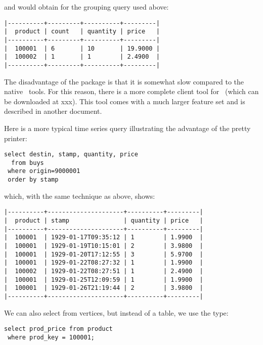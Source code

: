 and would obtain for the grouping query used above:

\begin{minipage}{\textwidth}
\begin{verbatim}
|----------+---------+----------+---------|
|  product | count   | quantity | price   |
|----------+---------+----------+---------|
|  100001  | 6       | 10       | 19.9000 |
|  100002  | 1       | 1        | 2.4900  |
|----------+---------+----------+---------|
\end{verbatim}
\end{minipage}

The disadvantage of the  package is that
it is somewhat slow compared to the native \nowdb\ tools.
For this reason, there is a more complete client tool
for \nowdb\ (which can be downloaded at xxx).
This tool comes with a much larger feature set
and is described in another document.

Here is a more typical time series query illustrating
the advantage of the pretty printer:

\begin{sqlcode}
\begin{lstlisting}
select destin, stamp, quantity, price
  from buys
 where origin=9000001 
 order by stamp
\end{lstlisting}
\end{sqlcode}

\begin{minipage}{\textwidth}
which, with the same technique as above, shows:
\begin{verbatim}
|----------+---------------------+----------+---------|
|  product | stamp               | quantity | price   |
|----------+---------------------+----------+---------|
|  100001  | 1929-01-17T09:35:12 | 1        | 1.9900  |
|  100001  | 1929-01-19T10:15:01 | 2        | 3.9800  |
|  100001  | 1929-01-20T17:12:55 | 3        | 5.9700  |
|  100001  | 1929-01-22T08:27:32 | 1        | 1.9900  |
|  100002  | 1929-01-22T08:27:51 | 1        | 2.4900  |
|  100001  | 1929-01-25T12:09:59 | 1        | 1.9900  |
|  100001  | 1929-01-26T21:19:44 | 2        | 3.9800  |
|----------+---------------------+----------+---------|
\end{verbatim}
\end{minipage}

We can also select from vertices,
but instead of a table, we use the type:

\begin{sqlcode}
\begin{lstlisting}
select prod_price from product
 where prod_key = 100001;
\end{lstlisting}
\end{sqlcode}


